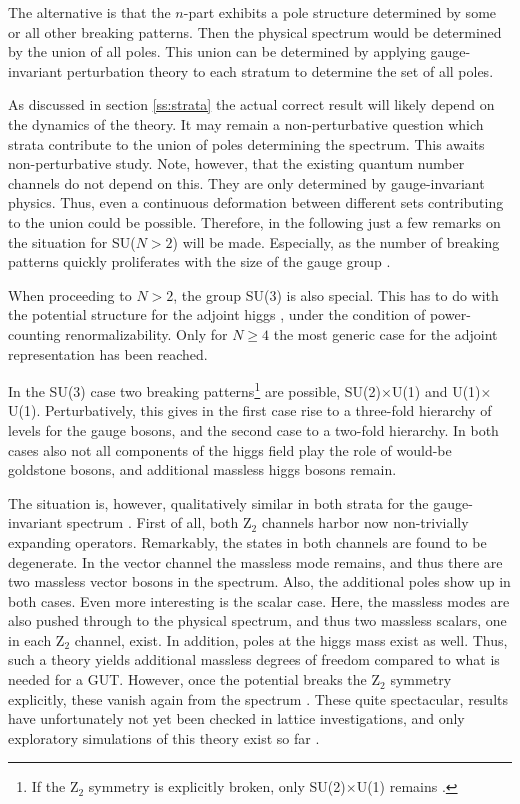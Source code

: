 \documentclass[final,12pt]{article}
\newcommand*{\1}{1\!\!\!\bot}
\begin{document}
The alternative is that the $n$-part exhibits a pole structure determined by some or all other breaking patterns. Then the physical spectrum would be determined by the union of all poles. This union can be determined by applying gauge-invariant perturbation theory to each stratum to determine the set of all poles.

As discussed in section \ref{ss:strata} the actual correct result will likely depend on the dynamics of the theory. It may remain a non-perturbative question which strata contribute to the union of poles determining the spectrum. This awaits non-perturbative study. Note, however, that the existing quantum number channels do not depend on this. They are only determined by gauge-invariant physics. Thus, even a continuous deformation between different sets contributing to the union could be possible. Therefore, in the following just a few remarks on the situation for SU($N>2$) will be made. Especially, as the number of breaking patterns quickly proliferates with the size of the gauge group \cite{Li:1973mq,Ruegg:1980gf,Murphy:1983rf,O'Raifeartaigh:1986vq,Kojima:2016fvv,Maas:2017xzh}.

When proceeding to $N>2$, the group SU(3) is also special. This has to do with the potential structure for the adjoint higgs \cite{O'Raifeartaigh:1986vq,Maas:2017xzh}, under the condition of power-counting renormalizability. Only for $N\ge 4$ the most generic case for the adjoint representation has been reached.

In the SU(3) case two breaking patterns\footnote{If the Z$_2$ symmetry is explicitly broken, only SU(2)$\times$U(1) remains \cite{O'Raifeartaigh:1986vq}.} are possible, SU(2)$\times$U(1) and U(1)$\times$U(1). Perturbatively, this gives in the first case rise to a three-fold hierarchy of levels for the gauge bosons, and the second case to a two-fold hierarchy. In both cases also not all components of the higgs field play the role of would-be goldstone bosons, and additional massless higgs bosons remain.

The situation is, however, qualitatively similar in both strata for the gauge-invariant spectrum \cite{Maas:2017xzh}. First of all, both Z$_2$ channels harbor now non-trivially expanding operators. Remarkably, the states in both channels are found to be degenerate. In the vector channel the massless mode remains, and thus there are two massless vector bosons in the spectrum. Also, the additional poles show up in both cases. Even more interesting is the scalar case. Here, the massless modes are also pushed through to the physical spectrum, and thus two massless scalars, one in each Z$_2$ channel, exist. In addition, poles at the higgs mass exist as well. Thus, such a theory yields additional massless degrees of freedom compared to what is needed for a GUT. However, once the potential breaks the Z$_2$ symmetry explicitly, these vanish again from the spectrum \cite{Maas:2017xzh}. These quite spectacular, results have unfortunately not yet been checked in lattice investigations, and only exploratory simulations of this theory exist so far \cite{Gupta:1983zv,Kikugawa:1985ex}.
\end{document}
